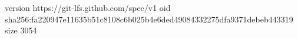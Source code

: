 version https://git-lfs.github.com/spec/v1
oid sha256:fa220947e11635b51c8108c6b025b4e6ded49084332275dfa9371debeb443319
size 3054
